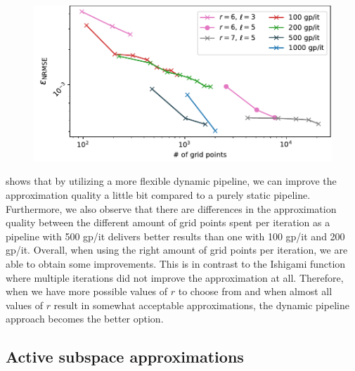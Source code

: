 \documentclass[
  a4paper,  %
  twoside,  %
  bibliography=totoc,
  headsepline,
  cleardoublepage=empty,
  parskip=half,
  draft=false
]{scrbook}
\begin{document}
\newpage
\begin{mdframed}[style=style]
\begin{figure}[H]
\vspace{-2mm}
\includegraphics[width=\textwidth]{graphics/ww_dynamic}\vspace{-4mm}
\delimit
{}
\label{fig:ww_dyn}
\end{figure}
\end{mdframed}
%
 shows that by utilizing a more flexible dynamic pipeline, we can improve the approximation quality a little bit compared to a purely static pipeline.
Furthermore, we also observe that there are differences in the approximation quality between the different amount of grid points spent per iteration as a pipeline with 500 gp/it delivers better results than one with 100 gp/it and 200 gp/it.
Overall, when using the right amount of grid points per iteration, we are able to obtain some improvements.
This is in contrast to the Ishigami function where multiple iterations did not improve the approximation at all.
Therefore, when we have more possible values of $r$ to choose from and when almost all values of $r$ result in somewhat acceptable approximations, the dynamic pipeline approach becomes the better option.

\subsection{Active subspace approximations}
\end{document}
